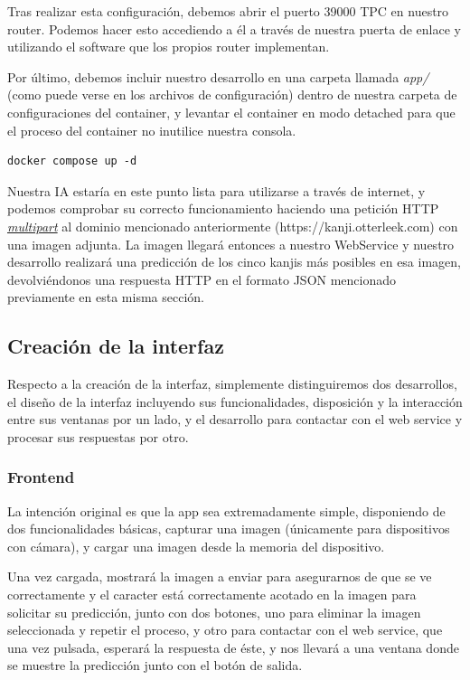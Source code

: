 \documentclass{article}
\begin{document}
Tras realizar esta configuración, debemos abrir el puerto 39000 TPC en nuestro router. Podemos hacer esto accediendo a él a través de nuestra puerta de enlace y utilizando el software que los propios router implementan.

Por último, debemos incluir nuestro desarrollo en una carpeta llamada \textit{app/} (como puede verse en los archivos de configuración) dentro de nuestra carpeta de configuraciones del container, y levantar el container en modo detached para que el proceso del container no inutilice nuestra consola.

\noindent\begin{minipage}{\textwidth}
\begin{lstlisting}[numbers=none]
docker compose up -d
\end{lstlisting}
\end{minipage}
Nuestra IA estaría en este punto lista para utilizarse a través de internet, y podemos comprobar su correcto funcionamiento haciendo una petición HTTP \hyperref[sec:terms]{\textit{multipart}\tec} al dominio mencionado anteriormente (https://kanji.otterleek.com) con una imagen adjunta. La imagen llegará entonces a nuestro WebService y nuestro desarrollo realizará una predicción de los cinco kanjis más posibles en esa imagen, devolviéndonos una respuesta HTTP en el formato JSON mencionado previamente en esta misma sección.

\subsection{Creación de la interfaz}

Respecto a la creación de la interfaz, simplemente distinguiremos dos desarrollos, el diseño de la interfaz incluyendo sus funcionalidades, disposición y la interacción entre sus ventanas por un lado, y el desarrollo para contactar con el web service y procesar sus respuestas por otro.

\subsubsection{Frontend}
La intención original es que la app sea extremadamente simple, disponiendo de dos funcionalidades básicas, capturar una imagen (únicamente para dispositivos con cámara), y cargar una imagen desde la memoria del dispositivo.

Una vez cargada, mostrará la imagen a enviar para asegurarnos de que se ve correctamente y el caracter está correctamente acotado en la imagen para solicitar su predicción, junto con dos botones, uno para eliminar la imagen seleccionada y repetir el proceso, y otro para contactar con el web service, que una vez pulsada, esperará la respuesta de éste, y nos llevará a una ventana donde se muestre la predicción junto con el botón de salida.
\end{document}
